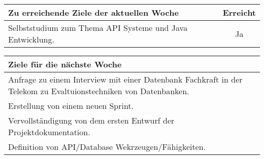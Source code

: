\begin{tabularx}{\textwidth}{Xc}
    \arrayrulecolor{OliveGreen}
    \toprule
    {\bfseries Zu erreichende Ziele der aktuellen Woche} & {\bfseries Erreicht} \\
    \midrule[2pt]
    Selbststudium zum Thema API Systeme und Java Entwicklung.                   &Ja                    \\
    \bottomrule[2pt]
\end{tabularx}
%
\vspace{1cm}
%
\begin{tabularx}{\textwidth}{Xc}
    \arrayrulecolor{OliveGreen}
    \toprule
    {\bfseries Ziele für die nächste Woche}              &                      \\
    \midrule[2pt]
    Anfrage zu einem Interview mit einer Datenbank Fachkraft in der Telekom zu Evaltuionstechniken von Datenbanken.         &                      \\
		\rowcolor{OliveGreen!15}
		Erstellung von einem neuen Sprint. & \\
		\rowcolor{White}
		Vervollständigung von dem ersten Entwurf der Projektdokumentation. & \\
		\rowcolor{OliveGreen!15}
		Definition von API/Database Wekrzeugen/Fähigkeiten. & \\
\end{tabularx}
